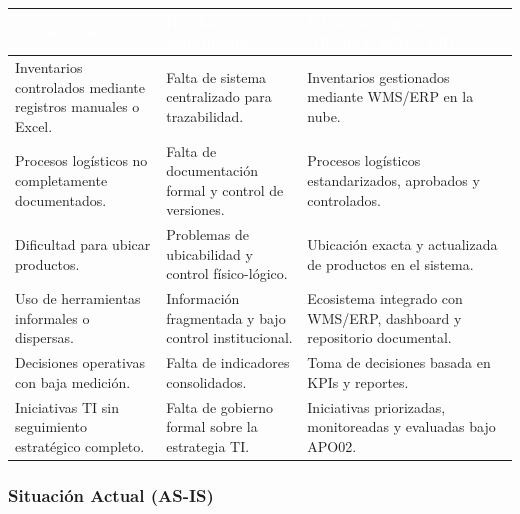 \documentclass[11pt]{article}
\newcounter{none} %
\begin{document}
\vspace{0.3cm}
\setlength{\tabcolsep}{5pt}
\renewcommand{\arraystretch}{1.5}
{\def\LTcaptype{none}
\begin{longtable}[]{@{}
  >{\raggedright\arraybackslash}p{0.30\linewidth}
  >{\raggedright\arraybackslash}p{0.28\linewidth}
  >{\raggedright\arraybackslash}p{0.42\linewidth}@{}}
\rowcolor{DeepNavy}
\textcolor{white}{\textbf{Situación actual}} & \textcolor{white}{\textbf{Brecha identificada}} & \textcolor{white}{\textbf{Situación esperada con APO02 y WMS/ERP}} \\ \hline
\endhead
\rowcolor{LightGray}
Inventarios controlados mediante registros manuales o Excel. & Falta de sistema centralizado para trazabilidad. & Inventarios gestionados mediante WMS/ERP en la nube. \\ \hline
Procesos logísticos no completamente documentados. & Falta de documentación formal y control de versiones. & Procesos logísticos estandarizados, aprobados y controlados. \\ \hline
\rowcolor{LightGray}
Dificultad para ubicar productos. & Problemas de ubicabilidad y control físico-lógico. & Ubicación exacta y actualizada de productos en el sistema. \\ \hline
Uso de herramientas informales o dispersas. & Información fragmentada y bajo control institucional. & Ecosistema integrado con WMS/ERP, dashboard y repositorio documental. \\ \hline
\rowcolor{LightGray}
Decisiones operativas con baja medición. & Falta de indicadores consolidados. & Toma de decisiones basada en KPIs y reportes. \\ \hline
Iniciativas TI sin seguimiento estratégico completo. & Falta de gobierno formal sobre la estrategia TI. & Iniciativas priorizadas, monitoreadas y evaluadas bajo APO02. \\ \hline
\end{longtable}
}

\subsubsection{Situación Actual (AS-IS)}
\end{document}

